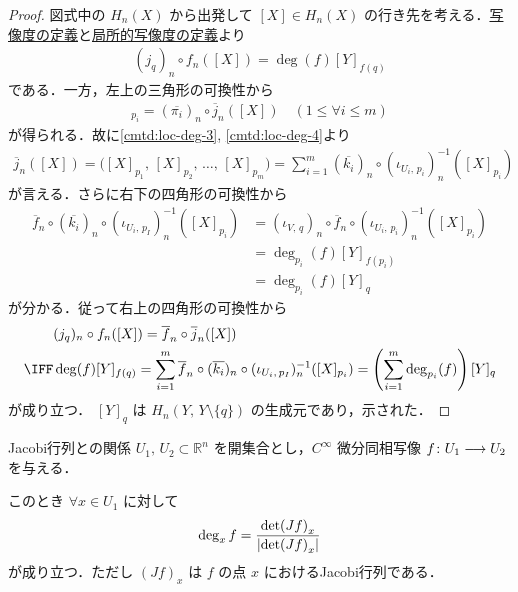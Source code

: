 \documentclass[algtopo_main]{subfiles}
\begin{document}
\begin{proof}
    
    図式中の $H_n(X)$ から出発して $[X] \in H_n(X)$ の行き先を考える．\hyperref[def:degree]{写像度の定義}と\hyperref[def:loc-degree]{局所的写像度の定義}より
    \begin{align}
        (j_q)_n \circ f_n ([X]) = \deg (f) [Y]_{f(q)}
    \end{align}
    である．一方，左上の三角形の可換性から
    \begin{align}
        [X]_{p_i} = (\overline{\pi_i})_n \circ \overline{j}_n ([X])\quad (1 \le \forall i \le m)
    \end{align}
    が得られる．故に\eqref{cmtd:loc-deg-3}, \eqref{cmtd:loc-deg-4}より
    \begin{align}
        \overline{j}_n ([X]) = \bigl( [X]_{p_1},\, [X]_{p_2},\, \dots ,\, [X]_{p_m} \bigr) = \sum_{i=1}^m (\overline{k_i})_n \circ (\iota_{U_i,\, p_i})^{-1}_n ([X]_{p_i})
    \end{align}
    が言える．さらに右下の四角形の可換性から
    \begin{align}
        \overline{f}_n \circ (\overline{k_i})_n\circ (\iota_{U_i,\, p_I})^{-1}_n ([X]_{p_i}) &= (\iota_{V,\, q})_n \circ \overline{f}_n \circ (\iota_{U_i,\, p_i})^{-1}_n ([X]_{p_i}) \\ 
        &= \deg_{p_i}(f) [Y]_{f(p_i)} \\
        &= \deg_{p_i}(f) [Y]_q
    \end{align}
    が分かる．従って右上の四角形の可換性から
    \begin{align}
        &(j_q)_n \circ f_n ([X]) = \overline{f}_n \circ \overline{j}_n ([X]) \\
        \IFF &\deg (f) [Y]_{f(q)} = \sum_{i=1}^m \overline{f}_n \circ (\overline{k_i})_n \circ (\iota_{U_i,\, p_I})^{-1}_n ([X]_{p_i}) = \left(\sum_{i=1}^m \deg_{p_i}(f)\right) [Y]_{q}
    \end{align}
    が成り立つ．
    $[Y]_q$ は $H_n(Y,\, Y \setminus \{q\})$ の生成元であり，示された．
\end{proof}


\begin{mytheo}[label=thm:degree-Jacobi]{Jacobi行列との関係}
    $U_1,\, U_2 \subset \mathbb{R}^n$ を開集合とし，$C^\infty$ 微分同相写像 $f \colon U_1 \longrightarrow U_2$ を与える．

    このとき $\forall x \in U_1$ に対して
    \begin{align}
        \deg_x f = \frac{\det(Jf)_x}{\abs{\det(Jf)_x}}
    \end{align}
    が成り立つ．ただし $(Jf)_x$ は $f$ の点 $x$ におけるJacobi行列である．
\end{mytheo}
\end{document}
